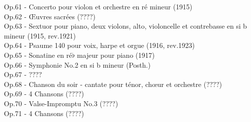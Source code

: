 Op.61 - Concerto pour violon et orchestre en ré mineur (1915)\\
Op.62 - Œuvres sacrées ($????$)\\
Op.63 - Sextuor pour piano, deux violons, alto, violoncelle et contrebasse en si b mineur (1915, rev.1921)\\
Op.64 - Psaume 140 pour voix, harpe et orgue (1916, rev.1923)\\
Op.65 - Sonatine en ré$\flat$ majeur pour piano (1917)\\
Op.66 - Symphonie No.2 en si b mineur (Posth.)\\
Op.67 - $????$\\
Op.68 - Chanson du soir - cantate pour ténor, chœur et orchestre ($????$)\\
Op.69 - 4 Chansons ($????$)\\
Op.70 - Valse-Impromptu No.3 ($????$)\\
Op.71 - 4 Chansons ($????$)
